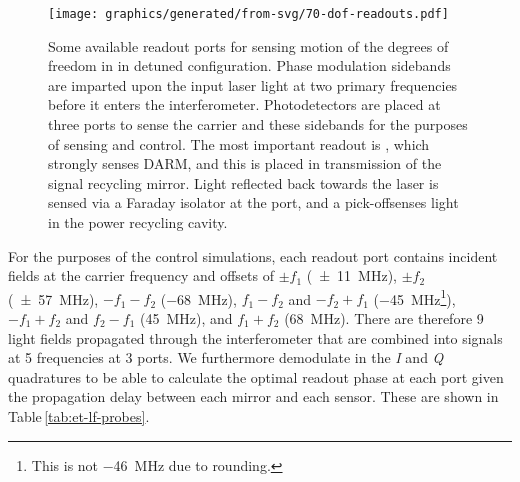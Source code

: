 \begin{figure}
  \centering
  \texttt{[image: graphics/generated/from-svg/70-dof-readouts.pdf]}
  \caption[Some available readout ports for sensing and control in \ETLF{} in detuned configuration]{\label{fig:dof-readouts}Some available readout ports for sensing motion of the degrees of freedom in \ETLF{} in detuned configuration. Phase modulation sidebands are imparted upon the input laser light at two primary frequencies before it enters the interferometer. Photodetectors are placed at three ports to sense the carrier and these sidebands for the purposes of sensing and control. The most important readout is \AS{}, which strongly senses \gls{DARM}, and this is placed in transmission of the signal recycling mirror. Light reflected back towards the laser is sensed via a Faraday isolator at the \REFL{} port, and a pick-off\textemdash \POP{}\textemdash senses light in the power recycling cavity.}
\end{figure}

For the purposes of the control simulations, each readout port contains incident fields at the carrier frequency and offsets of $\pm f_1$ (\SI{\pm11}{\mega\hertz}), $\pm f_2$ (\SI{\pm57}{\mega\hertz}), $-f_1 - f_2$ (\SI{-68}{\mega\hertz}), $f_1 - f_2$ and $-f_2 + f_1$ (\SI{-45}{\mega\hertz}\footnote{This is not \SI{-46}{\mega\hertz} due to rounding.}), $-f_1 + f_2$ and $f_2 - f_1$ (\SI{45}{\mega\hertz}), and $f_1 + f_2$ (\SI{68}{\mega\hertz}). There are therefore \num{9} light fields propagated through the interferometer that are combined into signals at \num{5} frequencies at \num{3} ports. We furthermore demodulate in the \emph{I} and \emph{Q} quadratures to be able to calculate the optimal readout phase at each port given the propagation delay between each mirror and each sensor. These are shown in Table\,\ref{tab:et-lf-probes}.

